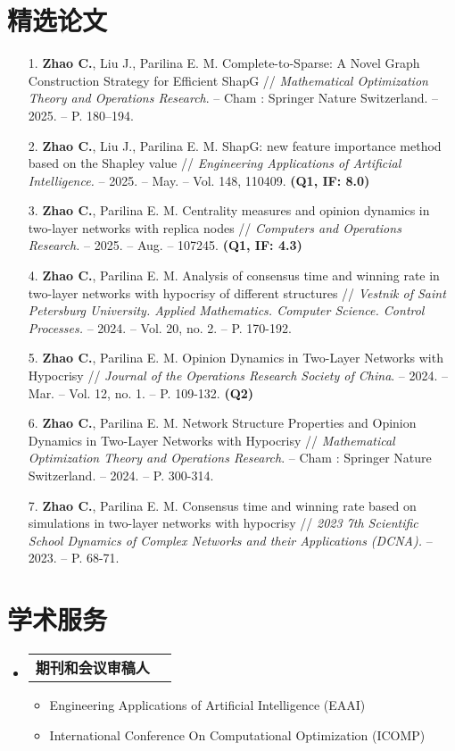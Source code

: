 \documentclass[UTF8,10pt]{ctexart}
\makeatletter
\newcommand{\resumeItem}[1]{
  \item\small{
    {#1 \vspace{-2pt}}
  }
}
\newcommand{\resumeProjectHeading}[2]{
  \item
  \begin{tabular*}{0.97\textwidth}{l@{\extracolsep{\fill}}r}
    \small#1 & #2 \\
  \end{tabular*}\vspace{-7pt}
}
\newenvironment{resumeSubHeadingList}{\begin{itemize}[leftmargin=0.15in, label={}]}{\end{itemize}}
\newenvironment{resumeItemList}{\begin{itemize}}{\end{itemize}}
\makeatother
\begin{document}
\section{精选论文}
\begin{enumerate}
  \fontsize{10}{10.5}\selectfont
  \item [1.] \textbf{Zhao C.}, Liu J., Parilina E. M. Complete-to-Sparse: A Novel Graph Construction Strategy for Efficient ShapG // {\it Mathematical Optimization Theory and Operations Research}. -- Cham : Springer Nature Switzerland. -- 2025. -- P. 180–194.
  \item [2.] \textbf{Zhao C.}, Liu J., Parilina E. M. ShapG: new feature importance method based on the Shapley value // {\it Engineering Applications of Artificial Intelligence.} -- 2025. -- May. -- Vol. 148, 110409. {\bf (Q1, IF: 8.0)}
  \item [3.] \textbf{Zhao C.}, Parilina E. M. Centrality measures and opinion dynamics in two-layer networks with replica nodes // {\it Computers and Operations Research.} -- 2025. -- Aug. -- 107245. {\bf (Q1, IF: 4.3)}
  \item [4.] \textbf{Zhao C.}, Parilina E. M. Analysis of consensus time and winning rate in two-layer networks with hypocrisy of different structures // {\it Vestnik of Saint Petersburg University. Applied Mathematics. Computer Science. Control Processes.} -- 2024. -- Vol. 20, no. 2. -- P. 170-192.
  \item [5.] \textbf{Zhao C.}, Parilina E. M. Opinion Dynamics in Two-Layer Networks with Hypocrisy // {\it Journal of the Operations Research Society of China}. -- 2024. -- Mar. -- Vol. 12, no. 1. -- P. 109-132. {\bf (Q2)}
  \item [6.] \textbf{Zhao C.}, Parilina E. M. Network Structure Properties and Opinion Dynamics in Two-Layer Networks with Hypocrisy // {\it Mathematical Optimization Theory and Operations Research}. -- Cham : Springer Nature Switzerland. -- 2024. -- P. 300-314.
  \item [7.] \textbf{Zhao C.}, Parilina E. M. Consensus time and winning rate based on simulations in two-layer networks with hypocrisy // {\it 2023 7th Scientific School Dynamics of Complex Networks and their Applications (DCNA).} -- 2023. -- P. 68-71.
\end{enumerate}

\section{学术服务}
\begin{resumeSubHeadingList}
  \resumeProjectHeading{{\bf 期刊和会议审稿人}}{}
  \begin{resumeItemList}
    \resumeItem{Engineering Applications of Artificial Intelligence (EAAI)}
    \resumeItem{International Conference On Computational Optimization (ICOMP)}
  \end{resumeItemList}
\end{resumeSubHeadingList}
\end{document}
